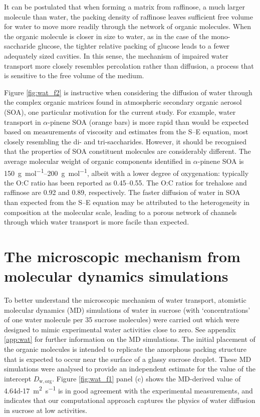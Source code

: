 It can be postulated that when forming a matrix from raffinose, a much larger molecule than water, the packing density of raffinose leaves sufficient free volume for water to move more readily through the network of organic molecules. When the organic molecule is closer in size to water, as in the case of the mono-saccharide glucose, the tighter relative packing of glucose leads to a fewer adequately sized cavities. In this sense, the mechanism of impaired water transport more closely resembles percolation rather than diffusion\cite{Shante1971,Shiraiwa2011}, a process that is sensitive to the free volume of the medium\cite{White2016}.

Figure \ref{fig:wat_f2} is instructive when considering the diffusion of water through the complex organic matrices found in atmospheric secondary organic aerosol (SOA), one particular motivation for the current study. For example, water transport in $\alpha$-pinene SOA (orange bars) is more rapid than would be expected based on measurements of viscosity and estimates from the S–E equation\cite{powerTransitionLiquidSolidlike2013,Molinero2005,Price2015}, most closely resembling the di- and tri-saccharides. However, it should be recognised that the properties of SOA constituent molecules are considerably different. The average molecular weight of organic components identified in $\alpha$-pinene SOA is \SIrange{150}{200}{\gram\per\mole}\cite{Chen2013}, albeit with a lower degree of oxygenation: typically the O:C ratio has been reported as \numrange{0.45}{0.55}\cite{zhang2015formation}. The O:C ratios for trehalose and raffinose are \num{0.92} and \num{0.89}, respectively. The faster diffusion of water in SOA than expected from the S–E equation may be attributed to the heterogeneity in composition at the molecular scale, leading to a porous network of channels through which water transport is more facile than expected.

\section{The microscopic mechanism from molecular dynamics simulations}\label{sec:wat_mech}

To better understand the microscopic mechanism of water transport, atomistic molecular dynamics (MD) simulations of water in sucrose (with ‘concentrations’ of one water molecule per \num{35} sucrose molecules) were carried out which were designed to mimic experimental water activities close to zero. See appendix \ref{app:wat} for further information on the MD simulations. The initial placement of the organic molecules is intended to replicate the amorphous packing structure that is expected to occur near the surface of a glassy sucrose droplet\cite{Mikhailov2009a}. These MD simulations were analysed to provide an independent estimate for the value of the intercept $D_{\mathrm{w,org}}$. Figure \ref{fig:wat_f1} panel (c) shows the MD-derived value of \SI{4.64d-17}{\meter\squared\per\second} is in good agreement with the experimental measurements, and indicates that our computational approach captures the physics of water diffusion in sucrose at low activities.

